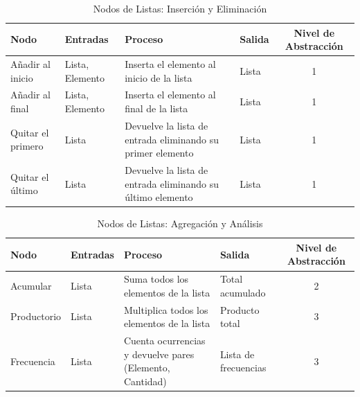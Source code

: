 \begin{table}[H]
    \centering
    \caption{Nodos de Listas: Inserción y Eliminación}
    \begin{tabularx}{\textwidth}{ l l X X c }
        \hline
        \textbf{Nodo}     & \textbf{Entradas} & \textbf{Proceso}                                           & \textbf{Salida} & \textbf{Nivel de Abstracción} \\ \hline
        Añadir al inicio  & Lista, Elemento   & Inserta el elemento al inicio de la lista                  & Lista           & 1                             \\
        Añadir al final   & Lista, Elemento   & Inserta el elemento al final de la lista                   & Lista           & 1                             \\
        Quitar el primero & Lista             & Devuelve la lista de entrada eliminando su primer elemento & Lista           & 1                             \\
        Quitar el último  & Lista             & Devuelve la lista de entrada eliminando su último elemento & Lista           & 1                             \\
        \hline
    \end{tabularx}
\end{table}

\begin{table}[H]
    \centering
    \caption{Nodos de Listas: Agregación y Análisis}
    \begin{tabularx}{\textwidth}{ l l X X c }
        \hline
        \textbf{Nodo} & \textbf{Entradas} & \textbf{Proceso}                                         & \textbf{Salida}      & \textbf{Nivel de Abstracción} \\ \hline
        Acumular      & Lista             & Suma todos los elementos de la lista                     & Total acumulado      & 2                             \\
        Productorio   & Lista             & Multiplica todos los elementos de la lista               & Producto total       & 3                             \\
        Frecuencia    & Lista             & Cuenta ocurrencias y devuelve pares (Elemento, Cantidad) & Lista de frecuencias & 3                             \\
        \hline
    \end{tabularx}
\end{table}

